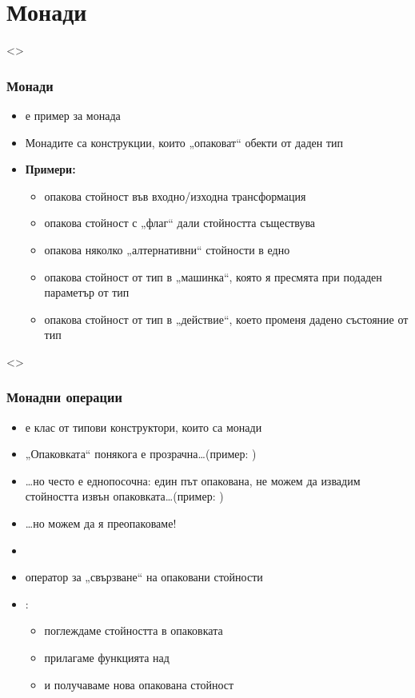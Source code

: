 \documentclass[alsotrans,beameroptions={aspectratio=169}]{beamerswitch}
\begin{document}
\section{Монади}

\begin{frame}<>
  \frametitle{Монади}

  \begin{itemize}[<+->]
  \item {} е пример за \alert{монада}
  \item Монадите са конструкции, които „опаковат“ обекти от даден тип
  \item \textbf{Примери:}
    \begin{itemize}
    \item {} опакова стойност във входно/изходна трансформация
    \item {} опакова стойност с „флаг“ дали стойността съществува
    \item \lst{[a]} опакова няколко „алтернативни“ стойности в едно
    \item {} опакова стойност от тип  в „машинка“, която я пресмята при подаден параметър от тип 
    \item {} опакова стойност от тип  в „действие“, което променя дадено състояние от тип 
    \end{itemize}
  \end{itemize}
\end{frame}

\begin{frame}<>
  \frametitle{Монадни операции}

  \begin{itemize}[<+->]
  \item {} е клас от \alert{типови конструктори}, които
    са монади
  \item „Опаковката“ понякога е прозрачна\ldots (пример: )
  \item \ldots но често е \alert{еднопосочна}: един път опакована, не можем да извадим стойността извън опаковката\ldots (пример: )
  \item \ldots но можем да я преопаковаме!
  \item {}
  \item оператор за „свързване“ на опаковани стойности
  \item {}:
    \begin{itemize}
    \item поглеждаме стойността  в опаковката 
    \item прилагаме функцията  над 
    \item и получаваме нова опакована стойност 
    \end{itemize}
  \end{itemize}
\end{frame}
\end{document}
